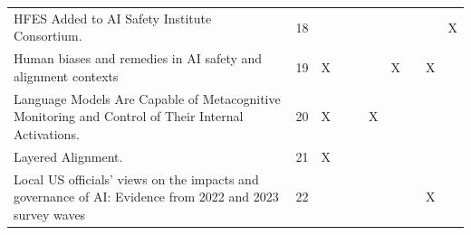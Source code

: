 \begin{landscape}
\begin{longtable}{|p{17cm}|c|c|c|c|c|c|c|c|c|}
		HFES Added to AI Safety Institute Consortium.                                                                                                           & 18          &                                    &                                                           &                                                       &                                                            &                                           &                                              &                                                    & X                                  \\
		Human biases and remedies in AI safety and alignment contexts                                                                                           & 19          & X                                  &                                                           &                                                       &                                                            & X                                         &                                              & X                                                  &                                    \\
		Language Models Are Capable of Metacognitive Monitoring and Control of Their Internal Activations.                                                      & 20          & X                                  &                                                           &                                                       & X                                                          &                                           &                                              &                                                    &                                    \\
		Layered Alignment.                                                                                                                                      & 21          & X                                  &                                                           &                                                       &                                                            &                                           &                                              &                                                    &                                    \\
		Local US officials' views on the impacts and governance of AI: Evidence from 2022 and 2023 survey waves                                                 & 22          &                                    &                                                           &                                                       &                                                            &                                           &                                              & X                                                  &                                    \\

\end{longtable}
\end{landscape}
